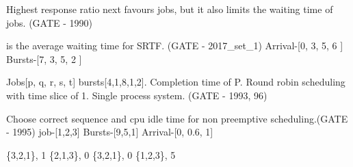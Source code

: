 \vspace{0.08in}



\begin{minipage}{\linewidth}


  \question Highest response ratio next favours   jobs, but it also limits the
            waiting time of  jobs. (GATE - 1990)

  \end{minipage}

\vspace{0.08in}



\begin{minipage}{\linewidth}

  \question \fillin[.........] is the average waiting time for SRTF. (GATE - 2017\_set\_1) \newline
            [P1, P2, P3, P4]
            Arrival-[0,  3,  5,  6 ]
            Bursts-[7,  3,  5,  2 ]

  \end{minipage}

\vspace{0.08in}



\begin{minipage}{\linewidth}

  \question Jobs[p, q, r, s, t] bursts[4,1,8,1,2]. Completion time of P. Round robin scheduling with time slice of 1.
            Single process system. (GATE - 1993, 96)

  \begin{oneparchoices}
  \end{oneparchoices}


  \end{minipage}

\vspace{0.08in}



\begin{minipage}{\linewidth}

  \question  Choose correct sequence and cpu idle time for non preemptive scheduling.(GATE - 1995)
             \newline job-[1,2,3] Bursts-[9,5,1] Arrival-[0, 0.6, 1]

  \begin{oneparchoices}
    \choice \{3,2,1\}, 1
    \choice \{2,1,3\}, 0
    \choice \{3,2,1\}, 0
    \choice \{1,2,3\}, 5
  \end{oneparchoices}

  \end{minipage}

